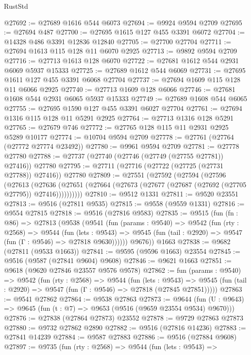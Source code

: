 \begin{lexlean}{RustStd}
\begin{coremodule}
@27692 := @27689 @1616 @544 @6073
@27694 := @9924 @9594 @2709
@27695 := @27694 @487
@27700 := @27695 @1615 @127 @455 @3391 @6072
@27704 := @14328 @486 @3391 @12836 @12840
@27705 := @27700 @27704
@27711 := @27694 @1613 @115 @128 @11 @6070 @2925
@27713 := @9892 @9594 @2709
@27716 := @27713 @1613 @128 @6070
@27722 := @27681 @1612 @544 @2931 @6069 @5937 @15333
@27725 := @27689 @1612 @544 @6069
@27731 := @27695 @1611 @127 @455 @3391 @6068 @27704
@27737 := @27694 @1609 @115 @128 @11 @6066 @2925
@27740 := @27713 @1609 @128 @6066
@27746 := @27681 @1608 @544 @2931 @6065 @5937 @15333
@27749 := @27689 @1608 @544 @6065
@27755 := @27695 @1590 @127 @455 @3391 @6027 @27704
@27761 := @27694 @1316 @115 @128 @11 @5291 @2925
@27764 := @27713 @1316 @128 @5291
@27765 := @27679 @746
@27772 := @27765 @128 @115 @11 @2931 @2925 @5289 @10177
@27774 := @10704 @9594 @2709
@27778 := @27761 (@27764 (@27772 @27774 @23492))
@27780 := @9961 @9594 @2709
@27781 := @27778 @27780
@27788 := @27737 (@27740 (@27746 (@27749 (@27755 @27781)) @27416)) @27780
@27795 := @27711 (@27716 (@27722 (@27725 (@27731 @27788)) @27416)) @27780
@27809 := @27551
    (@27592
      (@27594
        (@27596
          (@27613
            (@27636
              (@27651 (@27664 (@27673 (@27677 (@27687 (@27692 (@27705 @27795)) @27416))))))))))
@27810 := @9512 @1331
@27811 := @9520 @23551
@27813 := @9516 (@27811 @9535)
@27815 := @9558 (@9559 @1331)
@27816 := @9554 @27815
@27818 := @9516 (@27816 @9583)
@27835 := @9515
    (fun (fn : @86) =>
    @27813
      (@9538
        (@9541
          (fun (params : @9540) =>
          @9542
            (fun (rty : @2568) =>
            @9544
              (fun (lets : @9543) =>
              @9545 (fun (tail : @2920) => @9547 (fun (Γ : @9546) => @27818 @9630))))))
        @9676))
    @1663
@27838 := @9682 (@27811 (@9533 @1663))
@27841 := @9595 (@9596 @1663) @23554
@27845 := @9516 (@9587 (@27841 @9604) @9608)
@27846 := @9621 @1663
@27851 := @9618 (@9620 @27846 @23557 @9576 @9578)
@27862 := fun (params : @9540) =>
  @9542
    (fun (rty : @2568) =>
    @9544
      (fun (lets : @9543) =>
      @9545 (fun (tail : @2920) => @9547 (fun (Γ : @9546) => @27818 (@27845 @27851)))))
@27863 := @9541 @27862
@27864 := @9538 @27863
@27873 := @9644
    (fun (U : @9643) => @9645 (fun (t : @7) => @9653 (@9516 (@9659 @23554 @9534) @9670)))
@27876 := @27838 (@27864 @27873) @23552
@27878 := @9729 @27863 @27873
@27880 := @9732 @27862 @2890
@27882 := @9516 (@27816 @14236)
@27883 := @27841 @14239
@27884 := @9587 @27883
@27886 := @9516 (@27884 @9608)
@27897 := @9735
    (fun (rty : @2568) =>
    @9544
      (fun (lets : @9543) =>

\end{coremodule}
\end{lexlean}
